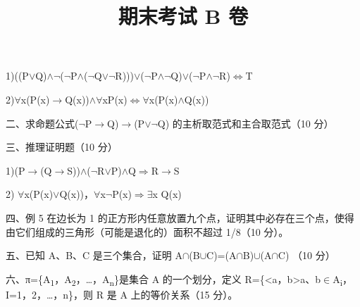 \documentclass[fontset=exam]{exam-zh}
\title{期末考试 B 卷}
\begin{document}
\maketitle
{}

\par{}\smallskip

1)((P\(\lor\)Q)\(\land\)\(\neg\)(\(\neg\)P\(\land\)(\(\neg\)Q\(\lor\)\(\neg\)R)))\(\lor\)(\(\neg\)P\(\land\)\(\neg\)Q)\(\lor\)(\(\neg\)P\(\land\)\(\neg\)R)\(\Leftrightarrow\)T

2)\(\forall\)x(P(x)\(\to\)Q(x))\(\land\)\(\forall\)xP(x)\(\Leftrightarrow\)\(\forall\)x(P(x)\(\land\)Q(x))


二、求命题公式(\(\neg\)P\(\to\)Q)\(\to\)(P\(\lor\)\(\neg\)Q) 的主析取范式和主合取范式（10 分）


三、推理证明题（10 分）

1)(P\(\to\)(Q\(\to\)S))\(\land\)(\(\neg\)R\(\lor\)P)\(\land\)Q\(\Rightarrow\)R\(\to\)S

2) \(\forall\)x(P(x)\(\lor\)Q(x))，\(\forall\)x\(\neg\)P(x)\(\Rightarrow\)\(\exists\)x Q(x)


四、例 5 在边长为 1 的正方形内任意放置九个点，证明其中必存在三个点，使得由它们组成的三角形（可能是退化的）面积不超过 1/8（10 分）。


五、已知 A、B、C 是三个集合，证明 A\(\cap\)(B\(\cup\)C)=(A\(\cap\)B)\(\cup\)(A\(\cap\)C) （10 分）


六、π=\{A\textsubscript{1}，A\textsubscript{2}，\ldots，A\textsubscript{n}\}是集合 A 的一个划分，定义 R=\{\textless a，b\textgreater\textbar a、b\(\in\)A\textsubscript{i}，I=1，2，\ldots，n\}，则 R 是 A 上的等价关系（15 分）。
\end{document}
